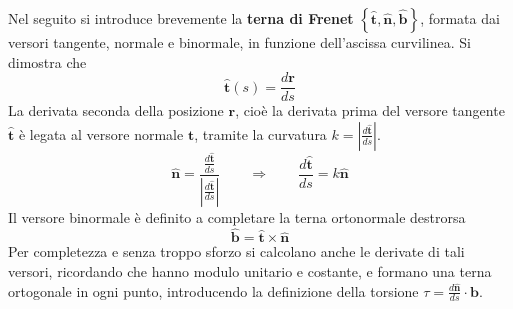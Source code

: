\noindent 
Nel seguito si introduce brevemente la \textbf{terna di Frenet} 
 $\left\{\bm{\hat{t}}, \bm{\hat{n}}, \bm{\hat{b}} \right\}$, formata
 dai versori tangente, normale e binormale, in funzione dell'ascissa
 curvilinea.
%
Si dimostra che
\begin{equation}
 \bm{\hat{t}}(s) = \dfrac{d\bm{r}}{ds}
\end{equation}
%
La derivata seconda della posizione $\bm{r}$, cioè la derivata prima del
 versore tangente $\bm{\hat{t}}$ è legata al versore normale
 $\bm{\hat{t}}$, tramite la curvatura $k = \left| \frac{d\bm{\hat{t}}}{
 ds} \right|$.
\begin{equation}
 \bm{\hat{n}} = \dfrac{\frac{d\bm{\hat{t}}}{ds}}
    {\left|\frac{d\bm{\hat{t}}}{ds} \right|} 
  \qquad \Rightarrow \qquad
 \dfrac{d\bm{\hat{t}}}{ds} = k \bm{\hat{n}}
\end{equation}
%
Il versore binormale è definito a completare la terna ortonormale 
 destrorsa
\begin{equation}
 \bm{\hat{b}} = \bm{\hat{t}} \times \bm{\hat{n}} 
\end{equation}
%
Per completezza e senza troppo sforzo si calcolano anche le derivate 
 di tali versori, ricordando che hanno modulo unitario e costante,
 e formano una terna ortogonale in ogni punto, introducendo la definizione
 della torsione $\tau = \frac{d \bm{\hat{n}}}{ds}\cdot \bm{b}$.
